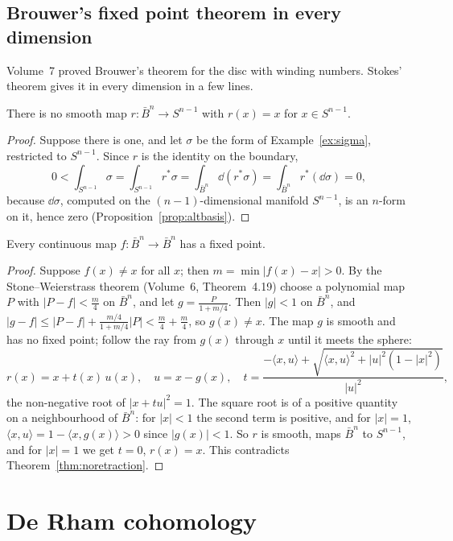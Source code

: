 \subsection*{Brouwer's fixed point theorem in every dimension}

Volume~7 proved Brouwer's theorem for the disc with winding numbers. Stokes' theorem gives it in every dimension in a few lines.

\begin{theorem}\label{thm:noretraction}
There is no smooth map $r\colon\bar B^n\to S^{n-1}$ with $r(x)=x$ for $x\in S^{n-1}$.
\end{theorem}
\begin{proof}
Suppose there is one, and let $\sigma$ be the form of Example~\ref{ex:sigma}, restricted to $S^{n-1}$. Since $r$ is the identity on the boundary,
\[
0<\int_{S^{n-1}}\sigma=\int_{S^{n-1}}r^*\sigma=\int_{\bar B^n}\dd(r^*\sigma)=\int_{\bar B^n}r^*(\dd\sigma)=0,
\]
because $\dd\sigma$, computed on the $(n-1)$-dimensional manifold $S^{n-1}$, is an $n$-form on it, hence zero (Proposition~\ref{prop:altbasis}).
\end{proof}

\begin{theorem}[Brouwer]\label{thm:brouwern}
Every continuous map $f\colon\bar B^n\to\bar B^n$ has a fixed point.
\end{theorem}
\begin{proof}
Suppose $f(x)\ne x$ for all $x$; then $m=\min|f(x)-x|>0$. By the Stone--Weierstrass theorem (Volume~6, Theorem~4.19) choose a polynomial map $P$ with
$|P-f|<\frac m4$ on $\bar B^n$, and let $g=\frac P{1+m/4}$. Then $|g|<1$ on $\bar B^n$, and $|g-f|\le|P-f|+\frac{m/4}{1+m/4}|P|<\frac m4+\frac m4$, so $g(x)\ne x$. The map $g$
is smooth and has no fixed point; follow the ray from $g(x)$ through $x$ until it meets the sphere:
\[
r(x)=x+t(x)\,u(x),\quad u=x-g(x),\quad t=\frac{-\langle x,u\rangle+\sqrt{\langle x,u\rangle^2+|u|^2(1-|x|^2)}}{|u|^2},
\]
the non-negative root of $|x+tu|^2=1$. The square root is of a positive quantity on a neighbourhood of $\bar B^n$: for $|x|<1$ the second term is positive, and for
$|x|=1$, $\langle x,u\rangle=1-\langle x,g(x)\rangle>0$ since $|g(x)|<1$. So $r$ is smooth, maps $\bar B^n$ to $S^{n-1}$, and for $|x|=1$ we get $t=0$, $r(x)=x$. This contradicts
Theorem~\ref{thm:noretraction}.
\end{proof}

\section{De Rham cohomology}

